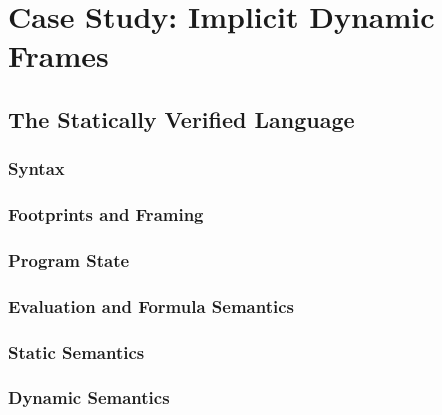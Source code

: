 \chapter{Case Study: Implicit Dynamic Frames}
\label{ch:case-study--implicit}


\section{The Statically Verified Language \svlidf}
\label{sec:language}


    \subsection{Syntax}
    \label{sec:syntax}
    
    
    \subsection{Footprints and Framing}
    \label{ssec:framing}
    
    
    \subsection{Program State}
    \label{ssec:program-state}
    
        
    \subsection{Evaluation and Formula Semantics}
    \label{ssec:formula-semantics}
    
    
    
    \subsection{Static Semantics}
    \label{sec:static-semantics}
    
    
    \subsection{Dynamic Semantics}
    \label{ssec:dynamic-semantics}
    
    
